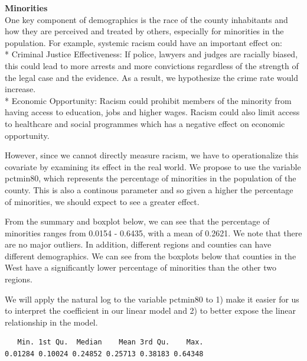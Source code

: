 \documentclass[]{article}
\newenvironment{Shaded}{}{}
\newcommand{\KeywordTok}[1]{\textcolor[rgb]{0.00,0.00,1.00}{#1}}
\newcommand{\NormalTok}[1]{#1}
\newcommand{\OperatorTok}[1]{#1}
\begin{document}
\textbf{Minorities}\\
One key component of demographics is the race of the county inhabitants
and how they are perceived and treated by others, especially for
minorities in the population. For example, systemic racism could have an
important effect on:\\
* Criminal Justice Effectiveness: If police, lawyers and judges are
racially biased, this could lead to more arrests and more convictions
regardless of the strength of the legal case and the evidence. As a
result, we hypothesize the crime rate would increase.\\
* Economic Opportunity: Racism could prohibit members of the minority
from having access to education, jobs and higher wages. Racism could
also limit access to healthcare and social programmes which has a
negative effect on economic opportunity.

However, since we cannot directly measure racism, we have to
operationalize this covariate by examining its effect in the real world.
We propose to use the variable pctmin80, which represents the percentage
of minorities in the population of the county. This is also a continous
parameter and so given a higher the percentage of minorities, we should
expect to see a greater effect.

From the summary and boxplot below, we can see that the percentage of
minorities ranges from 0.0154 - 0.6435, with a mean of 0.2621. We note
that there are no major outliers. In addition, different regions and
counties can have different demographics. We can see from the boxplots
below that counties in the West have a significantly lower percentage of
minorities than the other two regions.

We will apply the natural log to the variable pctmin80 to 1) make it
easier for us to interpret the coefficient in our linear model and 2) to
better expose the linear relationship in the model.

\begin{Shaded}
\end{Shaded}

\begin{verbatim}
   Min. 1st Qu.  Median    Mean 3rd Qu.    Max. 
0.01284 0.10024 0.24852 0.25713 0.38183 0.64348 
\end{verbatim}
\end{document}
